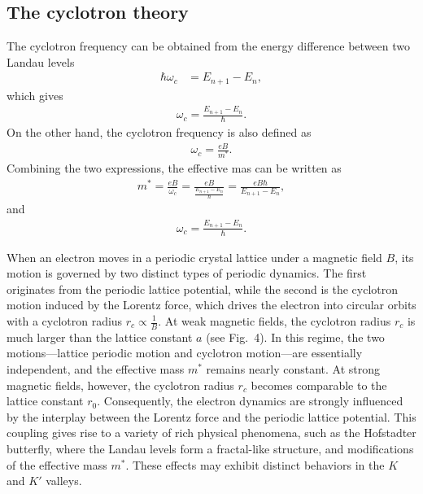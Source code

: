 \documentclass{article}
\begin{document}
\subsection{The cyclotron theory}
The cyclotron frequency can be obtained from the energy difference between two Landau levels
\begin{equation}
	\begin{aligned}
		\hbar \omega_{c} & = E_{n+1} - E_{n}  ,
	\end{aligned}
\end{equation}
which gives
\begin{equation}
	\begin{aligned}
		\omega_{c}  = \frac{E_{n+1} - E_{n}}{\hbar}.
	\end{aligned}
\end{equation}
On the other hand, the cyclotron frequency is also defined as
\begin{gather}
	\omega_{c}         = \frac{eB}{m^{*}}.
\end{gather}
Combining the two expressions, the effective mas can be written as
\begin{gather}
	m^{*}  =  \frac{eB}{\omega_{c}} = \frac{eB}{\frac{E_{n+1} - E_{n}}{\hbar}} = \frac{eB \hbar}{E_{n+1} - E_{n}},
\end{gather}
and
\begin{gather}
	\omega_{c} = \frac{E_{n+1} - E_{n}}{\hbar}.
\end{gather}

When an electron moves in a periodic crystal lattice under a magnetic field $B$, its motion is governed by two distinct types of periodic dynamics. The first originates from the periodic lattice potential, while the second is the cyclotron motion induced by the Lorentz force, which drives the electron into circular orbits with a cyclotron radius $r_{c} \propto \frac{1}{B}$. At weak magnetic fields, the cyclotron radius $r_{c}$ is much larger than the lattice constant $a$ (see Fig.~4). In this regime, the two motions---lattice periodic motion and cyclotron motion---are essentially independent, and the effective mass $m^{*}$ remains nearly constant. At strong magnetic fields, however, the cyclotron radius $r_{c}$ becomes comparable to the lattice constant $r_{0}$. Consequently, the electron dynamics are strongly influenced by the interplay between the Lorentz force and the periodic lattice potential. This coupling gives rise to a variety of rich physical phenomena, such as the Hofstadter butterfly, where the Landau levels form a fractal-like structure, and modifications of the effective mass $m^{*}$. These effects may exhibit distinct behaviors in the $K$ and $K'$ valleys.
\end{document}
